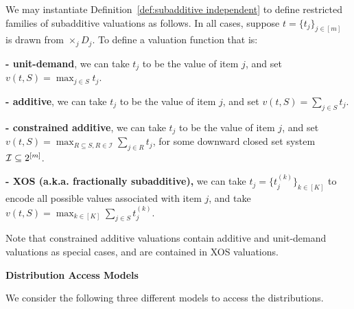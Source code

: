  \begin{example}\label{eg:valuation}\cite{RubinsteinW15}
We may instantiate Definition~\ref{def:subadditive independent} to define restricted families of subadditive valuations as follows. In all cases, suppose $t=\{t_j\}_{j\in[m]}$ is drawn from $\times_j D_j$. To define a valuation function that is:
\vspace{.05in}

\noindent\textbf{- unit-demand}, we can take $t_j$ to be the value of item $j$, and set $v(t,S)=\max_{j\in S}t_j$.

\vspace{.05in}

\noindent \textbf{- additive}, we can take $t_j$ to be the value of item $j$, and set $v(t,S)=\sum_{j\in S}t_j$.

\vspace{.05in}

\noindent \textbf{- constrained additive}, we can take $t_j$ to be the value of item $j$, and set $v(t,S)=\max_{R\subseteq S, R\in \mathcal{I}}\sum_{j\in R} t_j$, for some downward closed set system ${\cal I} \subseteq 2^{[m]}$.

\vspace{.05in}

\noindent \textbf{- XOS (a.k.a. fractionally subadditive),} we can take $t_j=\{t_{j}^{(k)}\}_{k\in[K]}$ to encode all possible values associated with item $j$, and take $v(t,S)=\max_{k\in[K]}\sum_{j\in S}t_{j}^{(k)}$.

\vspace{.05in}
Note that constrained additive valuations contain additive and unit-demand valuations as special cases, and are contained in XOS valuations.
\end{example}

\noindent\textbf{Distribution Access Models}
\vspace{.05in}

\noindent We consider the following three different models to access the distributions.

